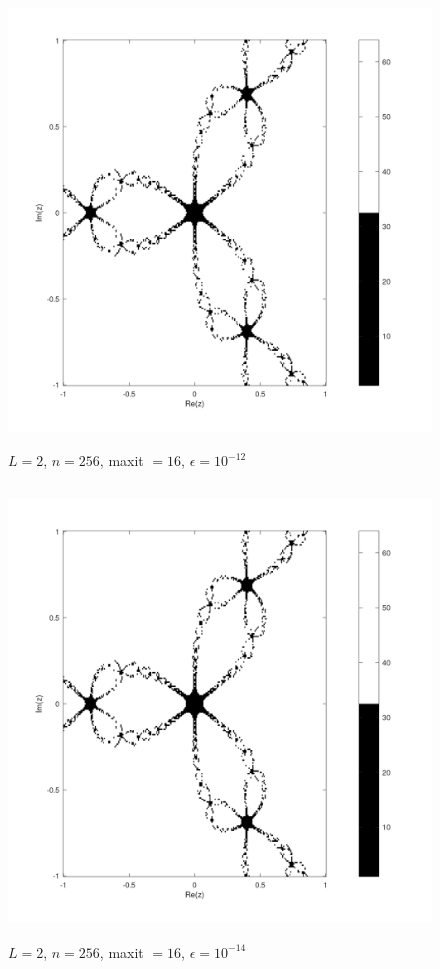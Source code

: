 \documentclass{article} %
\begin{document}
\begin{figure}[H]
    \centering
    \includegraphics[width=152mm, height=120mm]{images/L2n256maxit16e10-12.png}
    \caption{$L=2$, $n=256$, maxit $=16$, $\epsilon=10^{-12}$}
\end{figure}

\begin{figure}[H]
    \centering
    \includegraphics[width=152mm, height=120mm]{images/L2n256maxit16e10-14.png}
    \caption{$L=2$, $n=256$, maxit $=16$, $\epsilon=10^{-14}$}
\end{figure}
\end{document}
